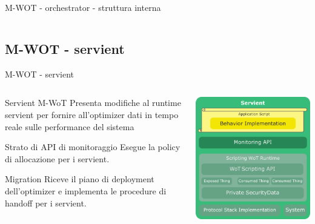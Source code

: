 \documentclass{beamer}
\begin{document}
\begin{frame}{M-WOT - orchestrator - struttura interna}
\begin{columns}
\begin{column}[c]{0.35\textwidth}
		\end{column}
	\end{columns}
\end{frame}

\subsection{M-WOT - servient}
\begin{frame}{M-WOT - servient}
	\begin{columns}
	\begin{column}[c]{0.6\textwidth}
		\begin{block}{Servient M-WoT}
			Presenta modifiche al runtime servient per fornire all'optimizer dati in tempo reale sulle performance del sistema
		\end{block}
		\begin{block}{Strato di API di monitoraggio}
			Esegue la policy di allocazione per i servient.
		\end{block}
		\begin{block}{Migration}
			Riceve il piano di deployment dell'optimizer e implementa le procedure di handoff per i servient.
		\end{block}
	\end{column}
	\begin{column}[c]{0.35\textwidth}
		\centering
		\includegraphics[width=\textwidth]{./images/9.png}
	\end{column}
\end{columns}
\end{frame}
\end{document}
